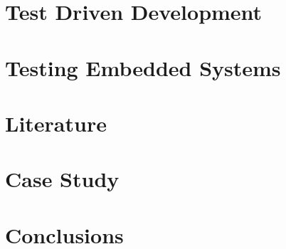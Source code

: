 \documentclass[11pt,oneside]{book}
\theoremstyle{definition}
\begin{document}
    \chapter{Test Driven Development}
    

    \chapter{Testing Embedded Systems}
    

    \chapter{Literature}
    

    \chapter{Case Study}
    

    \chapter{Conclusions}
    

    \nocite{*}
    \printbibliography[title={Bibliography}] 

    \begin{appendices}
        
    \end{appendices}
\end{document}
